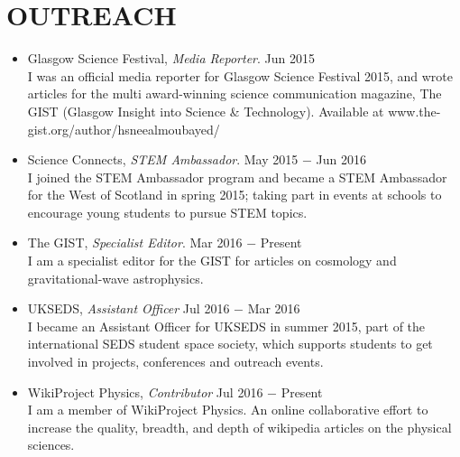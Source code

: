 
\section{OUTREACH}
\begin{itemize}
\item Glasgow Science Festival, {\sl Media Reporter}. \hfill Jun 2015 \\
I was an official media reporter for Glasgow Science Festival 2015, and wrote articles for the multi award-winning science communication magazine, The GIST (Glasgow Insight into Science \& Technology). Available at www.the-gist.org/author/hsneealmoubayed/ \\

\item Science Connects, {\sl STEM Ambassador}. \hfill May 2015 $-$ Jun 2016 \\
I joined the STEM Ambassador program and became a STEM Ambassador for the West of Scotland in spring 2015; taking part in events at schools to encourage young students to pursue STEM topics. \\

\item The GIST, {\sl Specialist Editor}. \hfill Mar 2016 $-$ Present \\
I am a specialist editor for the GIST for articles on cosmology and gravitational-wave astrophysics. \\

\item UKSEDS, {\sl Assistant Officer} \hfill Jul 2016 $-$ Mar 2016\\
I became an Assistant Officer for UKSEDS in summer 2015, part of the international SEDS student space society, which supports students to get involved in projects, conferences and outreach events. \\

\item WikiProject Physics, {\sl Contributor} \hfill Jul 2016 $-$ Present\\
I am a member of WikiProject Physics. An online collaborative effort to increase the quality, breadth, and depth of wikipedia articles on the physical sciences. \\

\end{itemize}

